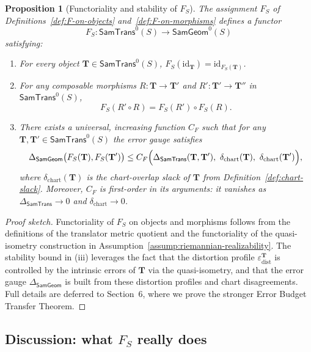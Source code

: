 \documentclass[11pt]{article}
\newtheorem{proposition}{Proposition}
\newcommand{\SamTrans}{\mathsf{SamTrans}}
\newcommand{\SamGeom}{\mathsf{SamGeom}}
\begin{document}
\begin{proposition}[Functoriality and stability of $F_S$]
\label{prop:F-functorial}
The assignment $F_S$ of Definitions~\ref{def:F-on-objects}
and~\ref{def:F-on-morphisms} defines a functor
\[
F_S : \SamTrans^0(S) \longrightarrow \SamGeom^0(S)
\]
satisfying:
\begin{enumerate}[]
  \item For every object $\mathbf{T} \in \SamTrans^0(S)$,
        $F_S(\mathrm{id}_{\mathbf{T}}) = \mathrm{id}_{F_S(\mathbf{T})}$.
  \item For any composable morphisms
        $R : \mathbf{T} \to \mathbf{T}'$ and
        $R' : \mathbf{T}' \to \mathbf{T}''$ in $\SamTrans^0(S)$,
        \[
        F_S(R' \circ R)
        =
        F_S(R') \circ F_S(R).
        \]
  \item There exists a universal, increasing function $C_F$
        such that for any $\mathbf{T}, \mathbf{T}' \in \SamTrans^0(S)$
        the error gauge satisfies
        \[
        \Delta_{\SamGeom}\bigl(F_S(\mathbf{T}), F_S(\mathbf{T}')\bigr)
        \le
        C_F\Bigl(
          \Delta_{\SamTrans}(\mathbf{T}, \mathbf{T}'),\
          \delta_{\mathrm{chart}}(\mathbf{T}),\
          \delta_{\mathrm{chart}}(\mathbf{T}')
        \Bigr),
        \]
        where $\delta_{\mathrm{chart}}(\mathbf{T})$ is the chart-overlap
        slack of $\mathbf{T}$ from Definition~\ref{def:chart-slack}.
        Moreover, $C_F$ is first-order in its arguments: it vanishes as
        $\Delta_{\SamTrans} \to 0$ and $\delta_{\mathrm{chart}} \to 0$.
\end{enumerate}
\end{proposition}

\begin{proof}[Proof sketch]
Functoriality of $F_S$ on objects and morphisms follows from the
definitions of the translator metric quotient and the functoriality of
the quasi-isometry construction in Assumption~\ref{assump:riemannian-realizability}.
The stability bound in (iii) leverages the fact that the distortion
profile $\varepsilon_{\mathrm{dist}}^{\mathbf{T}}$ is controlled by the
intrinsic errors of $\mathbf{T}$ via the quasi-isometry, and that the
error gauge $\Delta_{\SamGeom}$ is built from these distortion profiles
and chart disagreements.  Full details are deferred to
Section~6, where we prove the stronger Error Budget Transfer Theorem.
\end{proof}

\subsection{Discussion: what $F_S$ really does}
\end{document}
